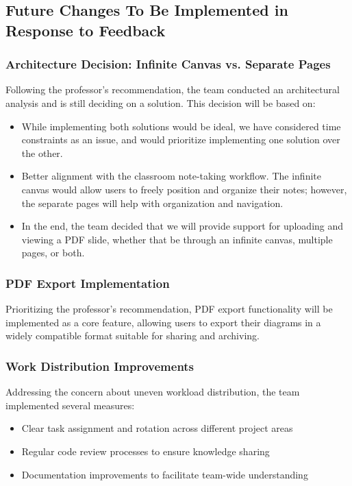 \documentclass[12pt, titlepage]{article}
\begin{document}
\subsection{Future Changes To Be Implemented in Response to Feedback}

\subsubsection{Architecture Decision: Infinite Canvas vs. Separate Pages}
Following the professor's recommendation, the team conducted an
architectural analysis and is still deciding on a solution.
This decision will be based on:

\begin{itemize}
\item While implementing both solutions would be ideal, we have considered
time constraints as an issue, and would prioritize implementing one
solution over the other.
\item Better alignment with the classroom note-taking workflow. The
infinite canvas would allow users to freely position and organize their notes;
however, the separate pages will help with organization and navigation.
\item In the end, the team decided that we will provide support for uploading
and viewing a PDF slide, whether that be through an infinite canvas,
multiple pages, or both.
\end{itemize}

\subsubsection{PDF Export Implementation}
Prioritizing the professor's recommendation, PDF export functionality
will be implemented as a core feature, allowing users to export their
diagrams in a widely compatible format suitable for sharing and
archiving.

\subsubsection{Work Distribution Improvements}
Addressing the concern about uneven workload distribution, the team
implemented several measures:

\begin{itemize}
\item Clear task assignment and rotation across different project areas
\item Regular code review processes to ensure knowledge sharing
\item Documentation improvements to facilitate team-wide understanding
\end{itemize}
\end{document}
